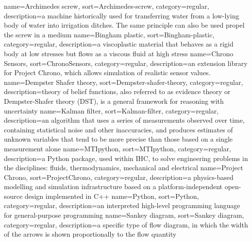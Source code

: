 %
{%
  name={Archimedes screw},%
  sort={Archimedes-screw},%
  category={regular},%
  description={a machine historically used for transferring water from a low-lying body of water into irrigation ditches. The same principle can also be used propel the screw in a medium}%
}
%
{%
  name={Bingham plastic},%
  sort={Bingham-plastic},%
  category={regular},%
  description={a viscoplastic material that behaves as a rigid body at low stresses but flows as a viscous fluid at high stress}%
}
%
{%
  name={Chrono Sensors},%
  sort={ChronoSensors},%
  category={regular},%
  description={an extension library for Project Chrono, which allows simulation of realistic sensor values.}%
}
%
{%
  name={Dempster Shafer theory},%
  sort={Dempster-shafer-theory},%
  category={regular},%
  description={theory of belief functions, also referred to as evidence theory or Dempster-Shafer theory (DST), is a general framework for reasoning with uncertainty}%
}
%
{%
  name={Kalman filter},%
  sort={Kalman-filter},%
  category={regular},%
  description={an algorithm that uses a series of measurements observed over time, containing statistical noise and other inaccuracies, and produces estimates of unknown variables that tend to be more precise than those based on a single measurement alone}%
}
%
{%
  name={MTIpython},%
  sort={MTIpython},%
  category={regular},%
  description={a Python package, used within IHC, to solve engineering problems in the disciplines: fluids, thermodynamics, mechanical and electrical}%
}
%
{%
  name={Project Chrono},%
  sort={ProjectChrono},%
  category={regular},%
  description={a physics-based modelling and simulation infrastructure based on a platform-independent open-source design implemented in C++}%
}
%
{%
  name={Python},%
  sort={Python},%
  category={regular},%
  description={an interpreted high-level programming language for general-purpose programming}%
}
%
{%
  name={Sankey diagram},%
  sort={Sankey diagram},%
  category={regular},%
  description={a specific type of flow diagram, in which the width of the arrows is shown proportionally to the flow quantity}%
}
